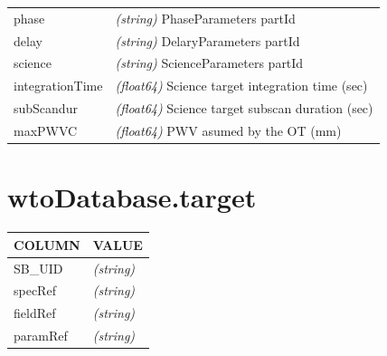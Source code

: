 \documentclass[a4paper,10pt,english]{sphinxmanual}
\begin{document}
\begin{tabulary}{\linewidth}{|L|L|}
phase
 & 
\emph{(string)} PhaseParameters partId
\\

delay
 & 
\emph{(string)} DelaryParameters partId
\\

science
 & 
\emph{(string)} ScienceParameters partId
\\

integrationTime
 & 
\emph{(float64)} Science target integration time (sec)
\\

subScandur
 & 
\emph{(float64)} Science target subscan duration (sec)
\\

maxPWVC
 & 
\emph{(float64)} PWV asumed by the OT (mm)
\\
\hline\end{tabulary}



\section{wtoDatabase.target}
\label{wtodata:wtodatabase-target}
\begin{tabulary}{\linewidth}{|L|L|}
\hline
\textsf{\relax 
COLUMN
} & \textsf{\relax 
VALUE
}\\
\hline
SB\_UID
 & 
\emph{(string)}
\\

specRef
 & 
\emph{(string)}
\\

fieldRef
 & 
\emph{(string)}
\\

paramRef
 & 
\emph{(string)}
\\
\hline\end{tabulary}
\end{document}
